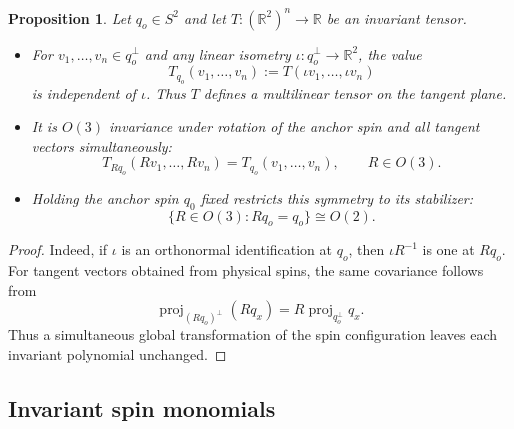 \documentclass[11pt]{article}
\newcommand{\R}{\mathbb R}
\newcommand{\proj}{\operatorname{proj}}
\numberwithin{equation}{section}
\newtheorem{proposition}[theorem]{Proposition}
\theoremstyle{definition}
\theoremstyle{plain}
\begin{document}
\begin{proposition}
\label{prop:tangent-tensor-invariance}
Let $q_o\in S^2$ and let $T:(\R^2)^n\to\R$ be an invariant tensor.
\begin{itemize}
\item For $v_1,\ldots,v_n\in q_o^\perp$
and any linear isometry $\iota:q_o^\perp\to\R^2$, the value
\begin{equation}
 T_{q_o}(v_1,\ldots,v_n):=T(\iota v_1,\ldots,\iota v_n)
\end{equation}
is independent of $\iota$.  Thus $T$ defines a multilinear tensor
on the tangent plane.
\item
It is $O(3)$ invariance under rotation of the anchor spin and
all tangent vectors simultaneously:
\begin{equation}
 T_{Rq_o}(Rv_1,\ldots,Rv_n)=T_{q_o}(v_1,\ldots,v_n),
 \qquad R\in O(3).
\end{equation}
\item
Holding the anchor spin $q_0$ fixed restricts this symmetry to its stabilizer:
\begin{equation}
 \{R\in O(3):Rq_o=q_o\}\cong O(2).
\end{equation}
\end{itemize}
\end{proposition}

\begin{proof}
Indeed, if $\iota$ is an orthonormal identification at $q_o$, then
$\iota R^{-1}$ is one at $Rq_o$.  For tangent vectors obtained
from physical spins, the same covariance follows from
\begin{equation}
 \proj_{(Rq_o)^\perp}(Rq_x)
 =R\proj_{q_o^\perp}q_x.
\end{equation}
Thus a simultaneous global transformation of the spin configuration
leaves each invariant polynomial unchanged. 
\end{proof}

\subsection{Invariant spin monomials}
\label{subsec:anchored-invariant-monomials}
\end{document}

